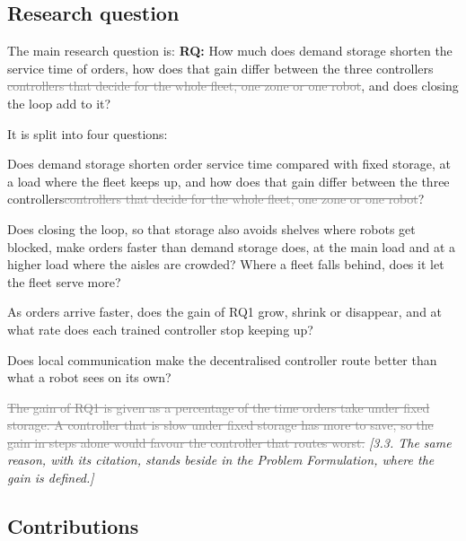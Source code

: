 \documentclass[11pt,a4paper]{article}
\newcommand{\new}[1]{\textcolor{newc}{#1}}
\newcommand{\old}[1]{\textcolor{gray}{\sout{#1}}}
\newcommand{\note}[1]{{\small\itshape [#1]}}
\newcommand{\lab}[1]{\textsf{\footnotesize\detokenize{#1}}}
\begin{document}
\subsection*{Research question}

The main research question is: \newline
\textbf{RQ:} How much does demand storage shorten the service time of
orders, how does that gain differ between \new{the three controllers}
\old{controllers that decide for the whole fleet, one zone or one robot},
and does closing the loop add to it?

It is split into four questions:
\begin{description}[nosep]
  \item[RQ1:] Does demand storage shorten order service time compared with
  fixed storage, at a load where the fleet keeps up, and how does that gain
  differ between \new{the three controllers}\old{controllers that decide for
  the whole fleet, one zone or one robot}?
  \item[RQ2:] Does closing the loop, so that storage also avoids shelves
  where robots get blocked, make orders faster than demand storage does,
  at the main load and at a higher load where the aisles are crowded?
  Where a fleet falls behind, does it let the fleet serve more?
  \item[RQ3:] As orders arrive faster, does the gain of RQ1 grow, shrink or
  disappear, and at what rate does each trained controller stop keeping up?
  \item[RQ4:] Does local communication make the decentralised controller
  route better than what a robot sees on its own?
\end{description}

\old{The gain of RQ1 is given as a percentage of the time orders take under
fixed storage. A controller that is slow under fixed storage has more to
save, so the gain in steps alone would favour the controller that routes
worst.}
\note{3.3. The same reason, with its citation, stands beside
\lab{eq:relgain} in the Problem Formulation, where the gain is defined.}

\subsection*{Contributions}
\end{document}
